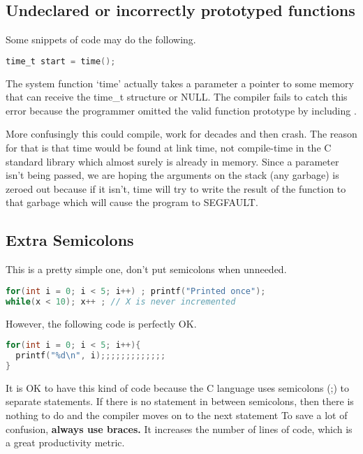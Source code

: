 \subsection{Undeclared or incorrectly prototyped functions}

Some snippets of code may do the following.

\begin{lstlisting}[language=C]
time_t start = time();
\end{lstlisting}

The system function `time' actually takes a parameter a pointer to some memory that can receive the time\_t structure or NULL.
The compiler fails to catch this error because the programmer omitted the valid function prototype by including .

More confusingly this could compile, work for decades and then crash.
The reason for that is that time would be found at link time, not compile-time in the C standard library which almost surely is already in memory.
Since a parameter isn't being passed, we are hoping the arguments on the stack (any garbage) is zeroed out because if it isn't, time will try to write the result of the function to that garbage which will cause the program to SEGFAULT.

\subsection{Extra Semicolons}

This is a pretty simple one, don't put semicolons when unneeded.

\begin{lstlisting}[language=C]
for(int i = 0; i < 5; i++) ; printf("Printed once");
while(x < 10); x++ ; // X is never incremented
\end{lstlisting}

However, the following code is perfectly OK.

\begin{lstlisting}[language=C]
for(int i = 0; i < 5; i++){
  printf("%d\n", i);;;;;;;;;;;;;
}
\end{lstlisting}

It is OK to have this kind of code because the C language uses semicolons (;) to separate statements.
If there is no statement in between semicolons, then there is nothing to do and the compiler moves on to the next statement
To save a lot of confusion, \textbf{always use braces.}
It increases the number of lines of code, which is a great productivity metric.


